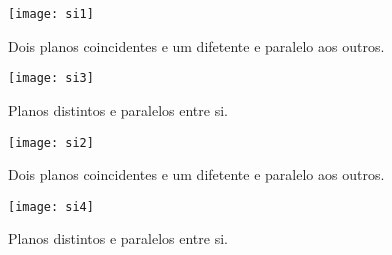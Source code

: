 \begin{enumerate}
\begin{figure}[H]
\begin{minipage}{0.45\linewidth}
\texttt{[image: si1]}
\caption{Dois planos coincidentes e um difetente e paralelo aos outros.}
\end{minipage} \hfill
\begin{minipage}{0.45\linewidth}
\texttt{[image: si3]}
\caption{Planos distintos e paralelos entre si.}
\end{minipage} 
\end{figure}

\begin{figure}[H]
\begin{minipage}{0.45\linewidth}
\texttt{[image: si2]}
\caption{Dois planos coincidentes e um difetente e paralelo aos outros.}
\end{minipage} \hfill
\begin{minipage}{0.45\linewidth}
\texttt{[image: si4]}
\caption{Planos distintos e paralelos entre si.}
\end{minipage} 
\end{figure}

\end{enumerate}


 

